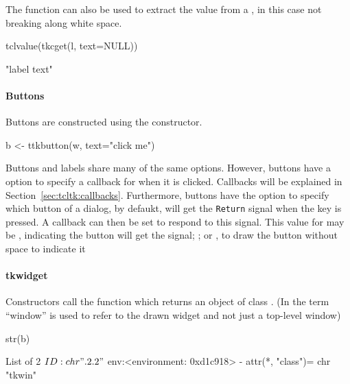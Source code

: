 The  function can also be used to extract the
value from a , in this case not breaking along white
space.
\begin{Schunk}
\begin{Sinput}
 tclvalue(tkcget(l, text=NULL))
\end{Sinput}
\begin{Soutput}
[1] "label text"
\end{Soutput}
\end{Schunk}



\paragraph{Buttons}
Buttons are constructed using the  constructor.
\begin{Schunk}
\begin{Sinput}
 b <- ttkbutton(w, text="click me")
\end{Sinput}
\end{Schunk}

Buttons and labels share many of the same options. However, buttons
have a  option to specify a callback for
when it is clicked. Callbacks will be explained in
Section~\ref{sec:tcltk:callbacks}.  Furthermore, buttons have the
option  to specify which button of a
dialog, by defaukt, will get the \texttt{Return} signal when the  key is
pressed. A callback can then be set to respond to this signal. This
value for  may be , indicating the button
will get the signal; ; or , to draw the
button without space to indicate it


\paragraph{tkwidget}
Constructors call the  function which returns an
object of class . (In \TK\/ the term ``window'' is used to
refer to the drawn widget and not just a top-level window)

\begin{Schunk}
\begin{Sinput}
 str(b)
\end{Sinput}
\begin{Soutput}
List of 2
 $ ID : chr ".2.2"
 $ env:<environment: 0xd1c918> 
 - attr(*, "class")= chr "tkwin"
\end{Soutput}
\end{Schunk}

